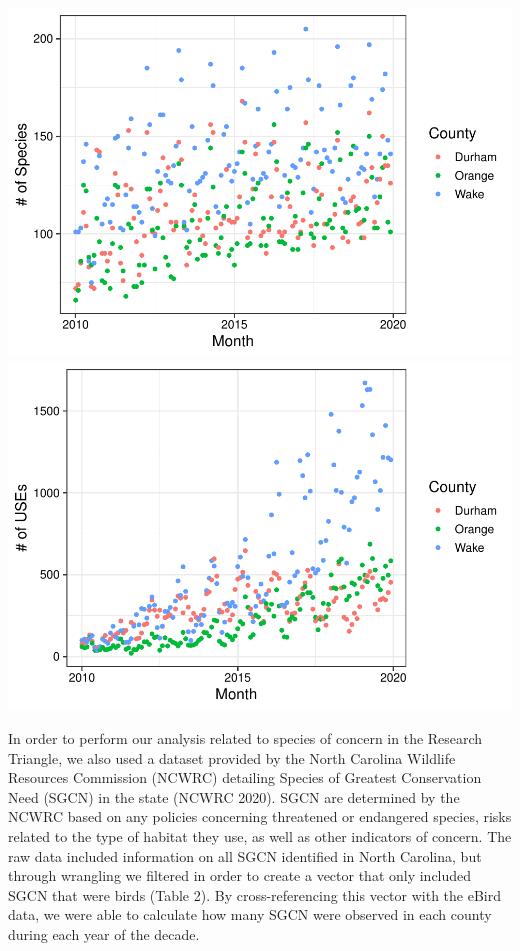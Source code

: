 \documentclass[
  12pt,
]{article}
\begin{document}
\includegraphics{Project_Template_files/figure-latex/SPP and Event Wrangling-1.pdf}
\includegraphics{Project_Template_files/figure-latex/SPP and Event Wrangling-2.pdf}

In order to perform our analysis related to species of concern in the
Research Triangle, we also used a dataset provided by the North Carolina
Wildlife Resources Commission (NCWRC) detailing Species of Greatest
Conservation Need (SGCN) in the state (NCWRC 2020). SGCN are determined
by the NCWRC based on any policies concerning threatened or endangered
species, risks related to the type of habitat they use, as well as other
indicators of concern. The raw data included information on all SGCN
identified in North Carolina, but through wrangling we filtered in order
to create a vector that only included SGCN that were birds (Table 2). By
cross-referencing this vector with the eBird data, we were able to
calculate how many SGCN were observed in each county during each year of
the decade.
\end{document}
